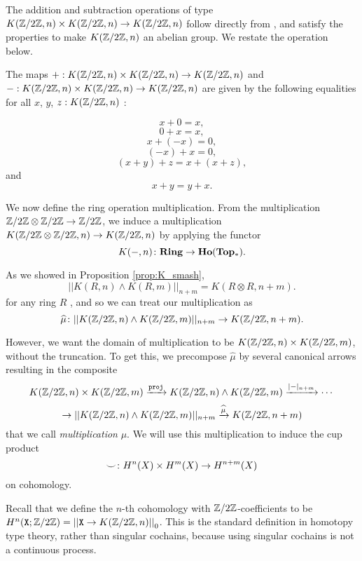 \documentclass{amsart}
\begin{document}
The addition and subtraction
operations of type $ K(\mathbb{Z}/2\mathbb{Z},n) \times K(\mathbb{Z}/2\mathbb{Z},n) \to K(\mathbb{Z}/2\mathbb{Z},n) $ follow
directly from \cite{brunerie:thesis}, and satisfy the properties to make $K(\mathbb{Z}/2\mathbb{Z},n)$ an abelian group. We restate the operation below.


\begin{proposition}\cite[Prop. 5.1.4]{brunerie:thesis}
	The maps $ +: K(\mathbb{Z}/2\mathbb{Z},n) \times K(\mathbb{Z}/2\mathbb{Z},n) \to K(\mathbb{Z}/2\mathbb{Z},n) $ and $-: K(\mathbb{Z}/2\mathbb{Z},n) \times K(\mathbb{Z}/2\mathbb{Z},n) \to K(\mathbb{Z}/2\mathbb{Z},n) $ are given by the following equalities for all $x$, $y$, $z:K(\mathbb{Z}/2\mathbb{Z},n)$ :
	
	\[x+0=x,\]
	\[0+x=x,\]
	\[x+(-x)=0,\]
	\[(-x)+x=0,\]
	\[(x+y)+z=x+(x+z),\]
	and
	\[x+y=y+x.\]
	
	\end{proposition}



We now define the ring operation multiplication. From the multiplication
$ \mathbb{Z}/2\mathbb{Z} \otimes \mathbb{Z}/2\mathbb{Z} \to \mathbb{Z}/2\mathbb{Z} $, we induce a multiplication
$ K(\mathbb{Z}/2\mathbb{Z} \otimes \mathbb{Z}/2\mathbb{Z}, n)\to K(\mathbb{Z}/2\mathbb{Z}, n) $ by applying the
functor
\[
K(-,n) \colon \mathbf{Ring} \to \mathbf{Ho}(\mathbf{Top_\ast}).
\]

As we showed in Proposition \ref{prop:K_smash}, 
\[
|| K(R,n) \wedge K(R,m) ||_{n+m} =
K (R \otimes R, n+m ).
\]
for any ring $ R $ , and so we can treat our multiplication as
\[
\widehat{\mu} \colon
|| K(\mathbb{Z}/2\mathbb{Z},n) \wedge K(\mathbb{Z}/2\mathbb{Z},m) ||_{n+m} \to K(\mathbb{Z}/2\mathbb{Z}, n+m).
\]


However, we want the domain of multiplication
to be $ K ( \mathbb{Z}/2\mathbb{Z} , n) \times K( \mathbb{Z}/2\mathbb{Z}, m) $, without the truncation. To get this, we
precompose $ \widehat{\mu} $ by several canonical arrows
resulting in the composite
\[
K (\mathbb{Z}/2\mathbb{Z} , n) \times K(\mathbb{Z}/2\mathbb{Z}, m)
\xrightarrow{\mathtt{proj}}
K (\mathbb{Z}/2\mathbb{Z} , n) \wedge K(\mathbb{Z}/2\mathbb{Z}, m)
\xrightarrow{|-|_{n+m}}\cdots\]
\[\rightarrow|| K (\mathbb{Z}/2\mathbb{Z} , n) \wedge K(\mathbb{Z}/2\mathbb{Z}, m) ||_{n+m}
\xrightarrow{\widehat{\mu}}
K(\mathbb{Z}/2\mathbb{Z}, n+m)
\]
that we call \emph{multiplication} $ \mu $.  We will use this multiplication to induce
the cup product
\[
\smile \colon H^n(X) \times H^m(X) \to H^{n+m}(X)
\]
on cohomology. 



Recall that we define the $ n $-th cohomology
with $ \mathbb{Z}/2\mathbb{Z} $-coefficients to be
$H^n(\mathtt{X};\mathbb{Z}/2\mathbb{Z})= \left| \left| \mathtt{X}\rightarrow K(\mathbb{Z}/2\mathbb{Z},n)\right| \right|_0$. This is the
standard definition in homotopy type theory, rather than
singular cochains, because using singular cochains is not
a continuous process. 
\end{document}
